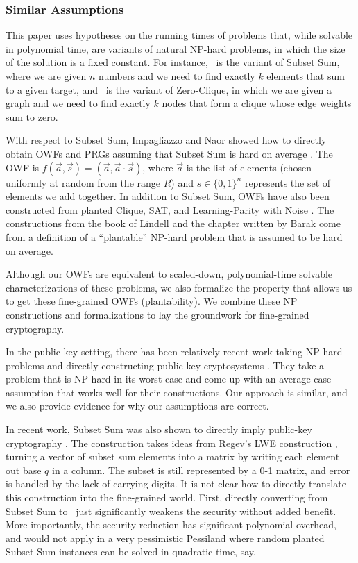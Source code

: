 \subsubsection{Similar Assumptions}
This paper uses hypotheses on the running times of problems that, while solvable in polynomial time, are variants of natural NP-hard problems, in which the size of the solution is a fixed constant. For instance, \kSum~is the variant of Subset Sum, where we are given $n$ numbers and we need to find exactly $k$ elements that sum to a given target, and \zkclique~is the variant of Zero-Clique, in which we are given a graph and we need to find exactly $k$ nodes that form a clique whose edge weights sum to zero.

With respect to Subset Sum, Impagliazzo and Naor showed how to directly obtain OWFs and PRGs assuming that Subset Sum is hard on average \cite{IN02}. The OWF is $f(\vec a, \vec s) = (\vec a, \vec a \cdot \vec s)$, where $\vec a$ is the list of elements (chosen uniformly at random from the range $R$) and $s \in \{0,1\}^n$ represents the set of elements we add together.
In addition to Subset Sum, OWFs have also been constructed from planted Clique, SAT, and Learning-Parity with Noise \cite{Lindell,JP00}. The constructions from the book of Lindell and the chapter written by Barak \cite{Lindell} come from a definition of a ``plantable'' NP-hard problem that is assumed to be hard on average.

Although our OWFs are equivalent to scaled-down, polynomial-time solvable characterizations of these problems, we also formalize the property that allows us to get these fine-grained OWFs (plantability). We combine these NP constructions and formalizations to lay the groundwork for fine-grained cryptography.

In the public-key setting, there has been relatively recent work taking NP-hard problems and directly constructing public-key cryptosystems \cite{ABW10}. They take a problem that is NP-hard in its worst case and come up with an average-case assumption that works well for their constructions. Our approach is similar, and we also provide evidence for why our assumptions are correct.

In recent work, Subset Sum was also shown to directly imply public-key cryptography \cite{LPS10}. The construction takes ideas from Regev's LWE construction \cite{Regev05}, turning a vector of subset sum elements into a matrix by writing each element out base $q$ in a column. The subset is still represented by a 0-1 matrix, and error is handled by the lack of carrying digits. It is not clear how to directly translate this construction into the fine-grained world. First, directly converting from Subset Sum to \kSum~just significantly weakens the security without added benefit. More importantly, the security reduction has significant polynomial overhead, and would not apply in a very pessimistic Pessiland where random planted Subset Sum instances can be solved in quadratic time, say.

